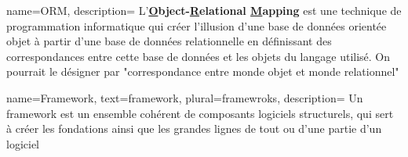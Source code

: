 {
    name=ORM,
    description=
    {
        L'\textbf{\underline{O}bject-\underline{R}elational \underline{M}apping} est une technique de programmation informatique qui créer l'illusion d'une base de données orientée objet à partir d'une base de données relationnelle en définissant des correspondances entre cette base de données et les objets du langage utilisé. On pourrait le désigner par "correspondance entre monde objet et monde relationnel"
    }
}

{
    name=Framework,
    text=framework,
    plural=framewroks,
    description=
    {
        Un framework est un ensemble cohérent de composants logiciels structurels, qui sert à créer les fondations ainsi que les grandes lignes de tout ou d’une partie d'un logiciel
    }
}